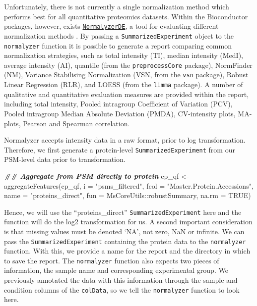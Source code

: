 \documentclass[9pt,a4paper,]{extarticle}
\newenvironment{Shaded}{\begin{snugshade}}{\end{snugshade}}
\newcommand{\AttributeTok}[1]{\textcolor[rgb]{0.77,0.63,0.00}{#1}}
\newcommand{\ConstantTok}[1]{\textcolor[rgb]{0.00,0.00,0.00}{#1}}
\newcommand{\DocumentationTok}[1]{\textcolor[rgb]{0.56,0.35,0.01}{\textbf{\textit{#1}}}}
\newcommand{\FunctionTok}[1]{\textcolor[rgb]{0.00,0.00,0.00}{#1}}
\newcommand{\NormalTok}[1]{#1}
\newcommand{\OtherTok}[1]{\textcolor[rgb]{0.56,0.35,0.01}{#1}}
\newcommand{\SpecialCharTok}[1]{\textcolor[rgb]{0.00,0.00,0.00}{#1}}
\newcommand{\StringTok}[1]{\textcolor[rgb]{0.31,0.60,0.02}{#1}}
\begin{document}
Unfortunately, there is not currently a single normalization method which
performs best for all quantitative proteomics datasets. Within the Bioconductor
packages, however, exists
\href{https://www.bioconductor.org/packages/release/bioc/html/NormalyzerDE.html}{\texttt{NormalyzerDE}},
a tool for evaluating different normalization methods \citep{Willforss2018}. By
passing a \texttt{SummarizedExperiment} object to the \texttt{normalyzer} function it is
possible to generate a report comparing common normalization strategies, such as
total intensity (TI), median intensity (MedI), average intensity (AI), quantile
(from the \texttt{preprocessCore} package)\citep{preprocessCore}, NormFinder (NM)\citep{Andersen2004},
Variance Stabilising Normalization (VSN, from the \texttt{vsn} package)\citep{Huber2002},
Robust Linear Regression (RLR), and LOESS (from the \texttt{limma} package)\citep{Smyth2004}.
A number of qualitative and quantitative evaluation measures are provided within
the report, including total intensity, Pooled intragroup Coefficient of Variation
(PCV), Pooled intragroup Median Absolute Deviation (PMDA), CV-intensity plots,
MA-plots, Pearson and Spearman correlation.

Normalyzer accepts intensity data in a raw format, prior to log transformation.
Therefore, we first generate a protein-level \texttt{SummarizedExperiment} from our
PSM-level data prior to transformation.

\begin{Shaded}
\begin{Highlighting}[]
\DocumentationTok{\#\# Aggregate from PSM directly to protein}
\NormalTok{cp\_qf }\OtherTok{\textless{}{-}} \FunctionTok{aggregateFeatures}\NormalTok{(cp\_qf,}
                           \AttributeTok{i =} \StringTok{"psms\_filtered"}\NormalTok{,}
                           \AttributeTok{fcol =} \StringTok{"Master.Protein.Accessions"}\NormalTok{,}
                           \AttributeTok{name =} \StringTok{"proteins\_direct"}\NormalTok{,}
                           \AttributeTok{fun =}\NormalTok{ MsCoreUtils}\SpecialCharTok{::}\NormalTok{robustSummary,}
                           \AttributeTok{na.rm =} \ConstantTok{TRUE}\NormalTok{)}
\end{Highlighting}
\end{Shaded}

Hence, we will use the ``proteins\_direct'' \texttt{SummarizedExperiment} here and the
function will do the log2 transformation for us. A second important consideration
is that missing values must be denoted `NA', not zero, NaN or infinite. We can
pass the \texttt{SummarizedExperiment} containing the protein data to the \texttt{normalyzer}
function. With this, we provide a name for the report and the directory in which
to save the report. The \texttt{normalyzer} function also expects two pieces of
information, the sample name and corresponding experimental group. We previously
annotated the data with this information through the sample and condition
columns of the \texttt{colData}, so we tell the \texttt{normalyzer} function to look here.
\end{document}

